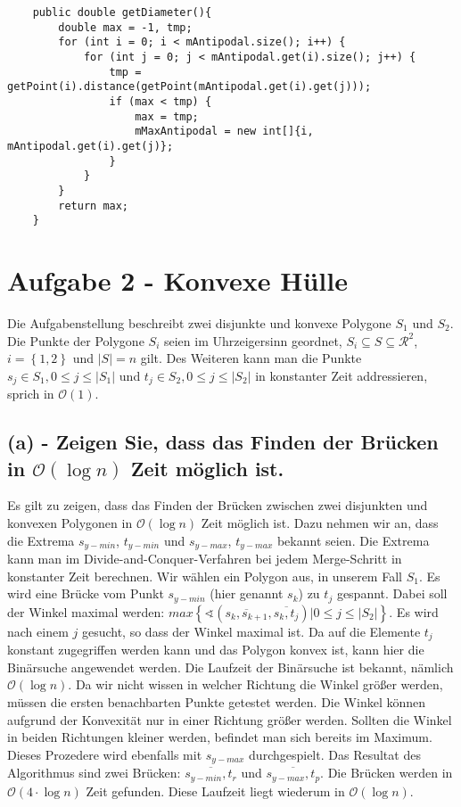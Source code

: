 \documentclass[a4paper]{article}
\begin{document}
\vspace*{0.5cm}
\begin{lstlisting}
	public double getDiameter(){
        double max = -1, tmp;
        for (int i = 0; i < mAntipodal.size(); i++) {
            for (int j = 0; j < mAntipodal.get(i).size(); j++) {
                tmp = getPoint(i).distance(getPoint(mAntipodal.get(i).get(j)));
                if (max < tmp) {
                    max = tmp;
                    mMaxAntipodal = new int[]{i, mAntipodal.get(i).get(j)};
                }
            }
        }
        return max;
    }
\end{lstlisting}

\section*{Aufgabe 2 - Konvexe Hülle}

Die Aufgabenstellung beschreibt zwei disjunkte und konvexe Polygone $S_1$ und $S_2$. Die Punkte der Polygone $S_i$ seien im Uhrzeigersinn geordnet, $S_i \subseteq S \subseteq \mathcal{R}^2$, $i = \left\{1, 2\right\}$ und $|S| = n$ gilt. Des Weiteren kann man die Punkte $s_j \in S_1, 0 \leq j \leq |S_1|$ und $t_j \in S_2, 0 \leq j \leq |S_2|$ in konstanter Zeit addressieren, sprich in $\mathcal{O}(1)$.

\subsection*{(a) - Zeigen Sie, dass das Finden der Brücken in $\mathcal{O}(\log n)$ Zeit möglich ist.}

Es gilt zu zeigen, dass das Finden der Brücken zwischen zwei disjunkten und konvexen Polygonen in $\mathcal{O}(\log n)$ Zeit möglich ist. 
Dazu nehmen wir an, dass die Extrema $s_{y-min}$, $t_{y-min}$ und $s_{y-max}$, $t_{y-max}$ bekannt seien. 
Die Extrema kann man im Divide-and-Conquer-Verfahren bei jedem Merge-Schritt in konstanter Zeit berechnen.
Wir wählen ein Polygon aus, in unserem Fall $S_1$. Es wird eine Brücke vom Punkt $s_{y-min}$ (hier genannt $s_k$) zu $t_j$ gespannt. 
Dabei soll der Winkel maximal werden: $max \left\{\sphericalangle \left(\overline{s_k,s_{k+1}},\overline{s_k,t_j}\right) \biggr| 0 \leq j \leq |S_2|\right\}$. 
Es wird nach einem $j$ gesucht, so dass der Winkel maximal ist. 
Da auf die Elemente $t_j$ konstant zugegriffen werden kann und das Polygon konvex ist, kann hier die Binärsuche angewendet werden. 
Die Laufzeit der Binärsuche ist bekannt, nämlich $\mathcal{O}(\log n)$. 
Da wir nicht wissen in welcher Richtung die Winkel größer werden, müssen die ersten benachbarten Punkte getestet werden. Die Winkel können aufgrund der Konvexität nur in einer Richtung größer werden. 
Sollten die Winkel in beiden Richtungen kleiner werden, befindet man sich bereits im Maximum.
Dieses Prozedere wird ebenfalls mit $s_{y-max}$ durchgespielt.
Das Resultat des Algorithmus sind zwei Brücken: $\overline{s_{y-min}, t_r}$ und $\overline{s_{y-max}, t_p}$. 
Die Brücken werden in $\mathcal{O}(4 \cdot \log n)$ Zeit gefunden. 
Diese Laufzeit liegt wiederum in $\mathcal{O}(\log n)$.
\end{document}
